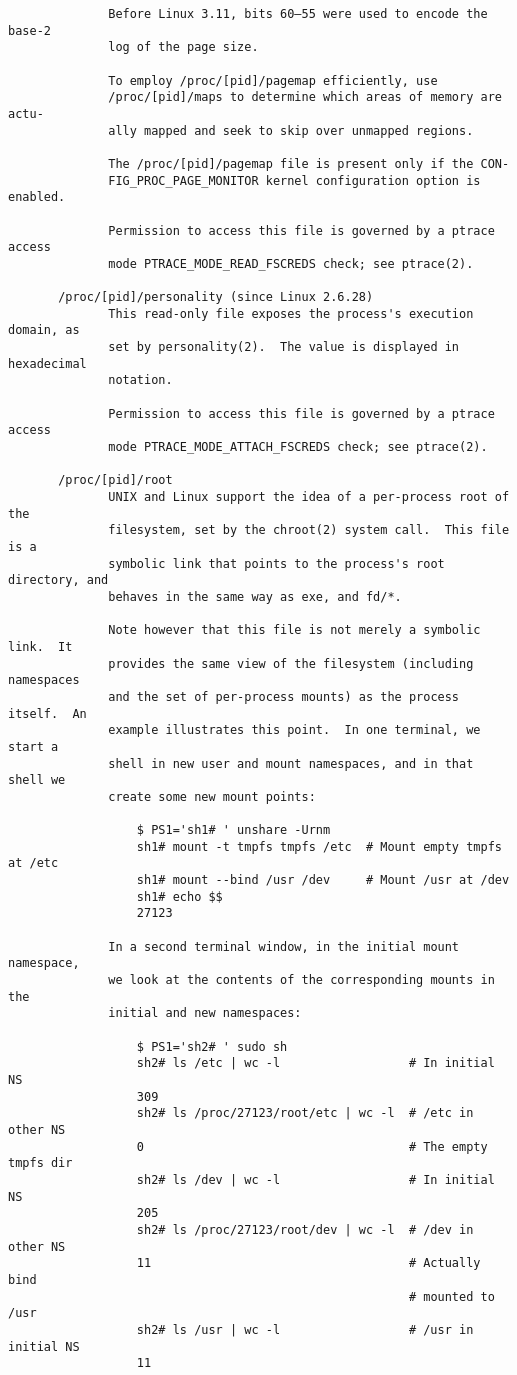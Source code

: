 \documentclass[]{article}
\begin{document}
\begin{verbatim}
              Before Linux 3.11, bits 60–55 were used to encode the base-2
              log of the page size.

              To employ /proc/[pid]/pagemap efficiently, use
              /proc/[pid]/maps to determine which areas of memory are actu‐
              ally mapped and seek to skip over unmapped regions.

              The /proc/[pid]/pagemap file is present only if the CON‐
              FIG_PROC_PAGE_MONITOR kernel configuration option is enabled.

              Permission to access this file is governed by a ptrace access
              mode PTRACE_MODE_READ_FSCREDS check; see ptrace(2).

       /proc/[pid]/personality (since Linux 2.6.28)
              This read-only file exposes the process's execution domain, as
              set by personality(2).  The value is displayed in hexadecimal
              notation.

              Permission to access this file is governed by a ptrace access
              mode PTRACE_MODE_ATTACH_FSCREDS check; see ptrace(2).

       /proc/[pid]/root
              UNIX and Linux support the idea of a per-process root of the
              filesystem, set by the chroot(2) system call.  This file is a
              symbolic link that points to the process's root directory, and
              behaves in the same way as exe, and fd/*.

              Note however that this file is not merely a symbolic link.  It
              provides the same view of the filesystem (including namespaces
              and the set of per-process mounts) as the process itself.  An
              example illustrates this point.  In one terminal, we start a
              shell in new user and mount namespaces, and in that shell we
              create some new mount points:

                  $ PS1='sh1# ' unshare -Urnm
                  sh1# mount -t tmpfs tmpfs /etc  # Mount empty tmpfs at /etc
                  sh1# mount --bind /usr /dev     # Mount /usr at /dev
                  sh1# echo $$
                  27123

              In a second terminal window, in the initial mount namespace,
              we look at the contents of the corresponding mounts in the
              initial and new namespaces:

                  $ PS1='sh2# ' sudo sh
                  sh2# ls /etc | wc -l                  # In initial NS
                  309
                  sh2# ls /proc/27123/root/etc | wc -l  # /etc in other NS
                  0                                     # The empty tmpfs dir
                  sh2# ls /dev | wc -l                  # In initial NS
                  205
                  sh2# ls /proc/27123/root/dev | wc -l  # /dev in other NS
                  11                                    # Actually bind
                                                        # mounted to /usr
                  sh2# ls /usr | wc -l                  # /usr in initial NS
                  11


\end{verbatim}
\end{document}
